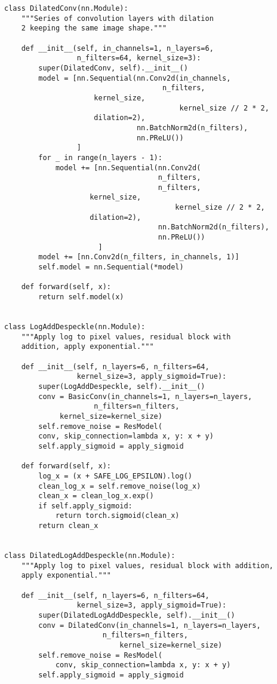 \documentclass[../main.tex]{subfiles}
\begin{document}
\begin{lstlisting}
class DilatedConv(nn.Module):
    """Series of convolution layers with dilation
    2 keeping the same image shape."""

    def __init__(self, in_channels=1, n_layers=6,
                 n_filters=64, kernel_size=3):
        super(DilatedConv, self).__init__()
        model = [nn.Sequential(nn.Conv2d(in_channels,
	                                 n_filters,
					 kernel_size,
                                         kernel_size // 2 * 2,
					 dilation=2),
                               nn.BatchNorm2d(n_filters),
                               nn.PReLU())
                 ]
        for _ in range(n_layers - 1):
            model += [nn.Sequential(nn.Conv2d(
	                                n_filters,
	                                n_filters,
					kernel_size,
                                        kernel_size // 2 * 2,
					dilation=2),
                                    nn.BatchNorm2d(n_filters),
                                    nn.PReLU())
                      ]
        model += [nn.Conv2d(n_filters, in_channels, 1)]
        self.model = nn.Sequential(*model)

    def forward(self, x):
        return self.model(x)


class LogAddDespeckle(nn.Module):
    """Apply log to pixel values, residual block with
    addition, apply exponential."""

    def __init__(self, n_layers=6, n_filters=64,
                 kernel_size=3, apply_sigmoid=True):
        super(LogAddDespeckle, self).__init__()
        conv = BasicConv(in_channels=1, n_layers=n_layers,
	                 n_filters=n_filters,
			 kernel_size=kernel_size)
        self.remove_noise = ResModel(
	    conv, skip_connection=lambda x, y: x + y)
        self.apply_sigmoid = apply_sigmoid

    def forward(self, x):
        log_x = (x + SAFE_LOG_EPSILON).log()
        clean_log_x = self.remove_noise(log_x)
        clean_x = clean_log_x.exp()
        if self.apply_sigmoid:
            return torch.sigmoid(clean_x)
        return clean_x


class DilatedLogAddDespeckle(nn.Module):
    """Apply log to pixel values, residual block with addition,
    apply exponential."""

    def __init__(self, n_layers=6, n_filters=64,
                 kernel_size=3, apply_sigmoid=True):
        super(DilatedLogAddDespeckle, self).__init__()
        conv = DilatedConv(in_channels=1, n_layers=n_layers,
	                   n_filters=n_filters,
                           kernel_size=kernel_size)
        self.remove_noise = ResModel(
        	conv, skip_connection=lambda x, y: x + y)
        self.apply_sigmoid = apply_sigmoid


\end{lstlisting}
\end{document}
